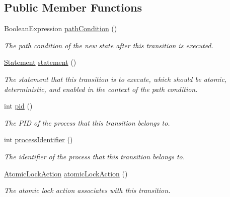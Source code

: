\subsection*{Public Member Functions}
\begin{DoxyCompactItemize}
\item 
Boolean\+Expression \hyperlink{interfaceedu_1_1udel_1_1cis_1_1vsl_1_1civl_1_1semantics_1_1IF_1_1Transition_a4e52172516c10888b8ce4d90d31715ba}{path\+Condition} ()
\begin{DoxyCompactList}\small\item\em The path condition of the new state after this transition is executed. \end{DoxyCompactList}\item 
\hyperlink{interfaceedu_1_1udel_1_1cis_1_1vsl_1_1civl_1_1model_1_1IF_1_1statement_1_1Statement}{Statement} \hyperlink{interfaceedu_1_1udel_1_1cis_1_1vsl_1_1civl_1_1semantics_1_1IF_1_1Transition_a0c5a7cc9b576c244fdde9931cd02c4af}{statement} ()
\begin{DoxyCompactList}\small\item\em The statement that this transition is to execute, which should be atomic, deterministic, and enabled in the context of the path condition. \end{DoxyCompactList}\item 
int \hyperlink{interfaceedu_1_1udel_1_1cis_1_1vsl_1_1civl_1_1semantics_1_1IF_1_1Transition_a720b704472232764e1dca5a2ac042dc7}{pid} ()
\begin{DoxyCompactList}\small\item\em The P\+I\+D of the process that this transition belongs to. \end{DoxyCompactList}\item 
int \hyperlink{interfaceedu_1_1udel_1_1cis_1_1vsl_1_1civl_1_1semantics_1_1IF_1_1Transition_a219a4aa7d636130ce4b2b27fbf99b7fe}{process\+Identifier} ()
\begin{DoxyCompactList}\small\item\em The identifier of the process that this transition belongs to. \end{DoxyCompactList}\item 
\hyperlink{enumedu_1_1udel_1_1cis_1_1vsl_1_1civl_1_1semantics_1_1IF_1_1Transition_1_1AtomicLockAction}{Atomic\+Lock\+Action} \hyperlink{interfaceedu_1_1udel_1_1cis_1_1vsl_1_1civl_1_1semantics_1_1IF_1_1Transition_a85c59d782c690d33935abbaf829be5f6}{atomic\+Lock\+Action} ()
\begin{DoxyCompactList}\small\item\em The atomic lock action associates with this transition. \end{DoxyCompactList}\item 

\end{DoxyCompactItemize}
